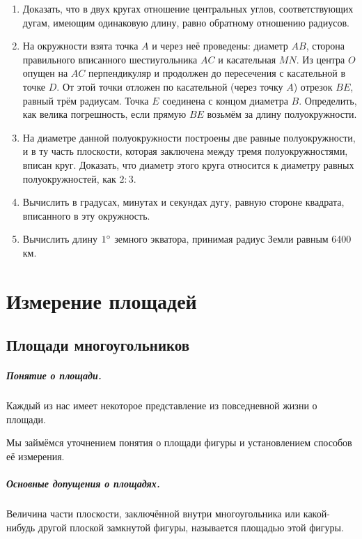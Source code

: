 \documentclass[oneside]{book}
\begin{document}
\begin{enumerate}

 \item
Доказать, что в двух кругах отношение центральных углов, соответствующих дугам, имеющим одинаковую длину, равно обратному отношению радиусов.

 \item
На окружности взята точка $A$ и через неё проведены:
диаметр $AB$, сторона правильного вписанного шестиугольника $AC$ и касательная $MN$.
Из центра $O$ опущен на $AC$ перпендикуляр и продолжен до пересечения с касательной в точке $D$.
От этой точки отложен по касательной (через точку $A$) отрезок $BE$, равный трём радиусам.
Точка $E$ соединена с концом диаметра $B$.
Определить, как велика погрешность, если прямую $BE$ возьмём за длину полуокружности.

 \item
На диаметре данной полуокружности построены две равные полуокружности, и в ту часть плоскости, которая заключена между тремя полуокружностями, вписан круг.
Доказать, что диаметр этого круга относится к диаметру равных полуокружностей, как $2:3$.

 \item
Вычислить в градусах, минутах и секундах дугу, равную стороне квадрата, вписанного в эту окружность.

 \item
Вычислить длину $1\degree$ земного экватора, принимая радиус Земли равным 6400 км.

\end{enumerate}

\chapter{Измерение площадей}

\section{Площади многоугольников}

\paragraph{Понятие о площади.}\label{1938/242}
Каждый из нас имеет некоторое представление из повседневной жизни о площади.

Мы займёмся уточнением понятия о площади фигуры и установлением способов её измерения.

\paragraph{Основные допущения о площадях.}\label{1938/243}
Величина части плоскости, заключённой внутри многоугольника или какой-нибудь другой плоской замкнутой фигуры, называется площадью этой фигуры.
\end{document}
